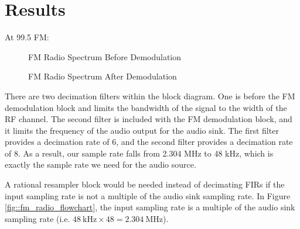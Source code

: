 \documentclass{article}
\begin{document}
\section{Results}

At 99.5 FM:

\begin{figure}[H]
	\centerline{}
	\caption{FM Radio Spectrum Before Demodulation}
	\label{fig::spectrum_before_demodulation}
\end{figure}

\begin{figure}[H]
	\centerline{}
	\caption{FM Radio Spectrum After Demodulation}
	\label{fig::spectrum_after_demodulation}
\end{figure}

There are two decimation filters within the block diagram. One is before the FM demodulation block and limits the bandwidth of the signal to the width of the RF channel. The second filter is included with the FM demodulation block, and it limits the frequency of the audio output for the audio sink. The first filter provides a decimation rate of 6, and the second filter provides a decimation rate of 8. As a result, our sample rate falls from 2.304 MHz to 48 kHz, which is exactly the sample rate we need for the audio source.

A rational resampler block would be needed instead of decimating FIRs if the input sampling rate is not a multiple of the audio sink sampling rate. In Figure \ref{fig::fm_radio_flowchart}, the input sampling rate is a multiple of the audio sink sampling rate (i.e. $48\ \text{kHz} \times 48 = 2.304\ \text{MHz}$).
\end{document}
